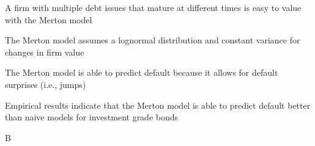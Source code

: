 \documentclass{article}
\begin{document}
\begin{choices}
    \item A firm with multiple debt issues that mature at different times is easy to value with the Merton model
    \item The Merton model assumes a lognormal distribution and constant variance for changes in firm value
    \item The Merton model is able to predict default because it allows for default surprises (i.e., jumps)
    \item Empirical results indicate that the Merton model is able to predict default better than naive models for investment grade bonds
\end{choices}

\begin{correctanswer}
    B
\end{correctanswer}
\end{document}
